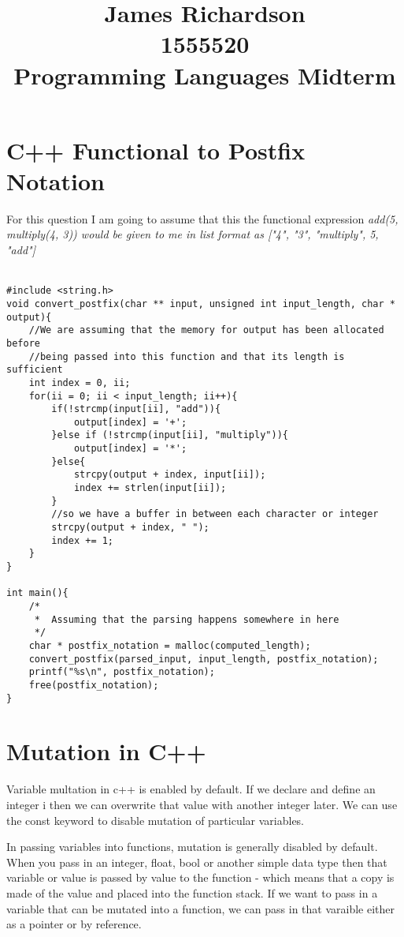 \documentclass[11pt]{article}
\begin{document}
\title{James Richardson\\1555520\\Programming Languages Midterm}
\maketitle

\newpage
\section{C++ Functional to Postfix Notation}
For this question I am going to assume that this the functional expression
\it{add(5, multiply(4, 3))} \rm{would be given to me in list format as}
\it{["4", "3", "multiply", 5, "add"]}
\rm\\\\

\begin{lstlisting}[style=MyC++]
#include <string.h>
void convert_postfix(char ** input, unsigned int input_length, char * output){
    //We are assuming that the memory for output has been allocated before
    //being passed into this function and that its length is sufficient
    int index = 0, ii;
    for(ii = 0; ii < input_length; ii++){
        if(!strcmp(input[ii], "add")){
            output[index] = '+';
        }else if (!strcmp(input[ii], "multiply")){
            output[index] = '*';
        }else{
            strcpy(output + index, input[ii]);
            index += strlen(input[ii]);
        }
        //so we have a buffer in between each character or integer
        strcpy(output + index, " ");
        index += 1;
    }
}

int main(){
    /*
     *  Assuming that the parsing happens somewhere in here
     */
    char * postfix_notation = malloc(computed_length);
    convert_postfix(parsed_input, input_length, postfix_notation);
    printf("%s\n", postfix_notation);
    free(postfix_notation);
}
\end{lstlisting}

\newpage

\section{Mutation in C++}
Variable multation in c++ is enabled by default.  If we declare and define an
integer i then we can overwrite that value with another integer later.
We can use the const keyword to disable mutation of particular variables.

In passing variables into functions, mutation is generally disabled by default.
When you pass in an integer, float, bool or another simple data type then that
variable or value is passed by value to the function - which means that a copy
is made of the value and placed into the function stack.  If we want to pass in
a variable that can be mutated into a function, we can pass in that varaible
either as a pointer or by reference.
\end{document}
